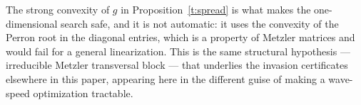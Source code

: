 \beR[]
\label{r:spread-conic-scope}
The strong convexity of $g$ in Proposition~\ref{t:spread} is what makes the one-dimensional search
safe, and it is not automatic: it uses the convexity of the Perron root
in the diagonal entries, which is a property of Metzler matrices and
would fail for a general linearization. This is the same structural
hypothesis --- irreducible Metzler transversal block --- that underlies
the invasion certificates elsewhere in this paper, appearing here in the
different guise of making a wave-speed optimization tractable.
\eeR

